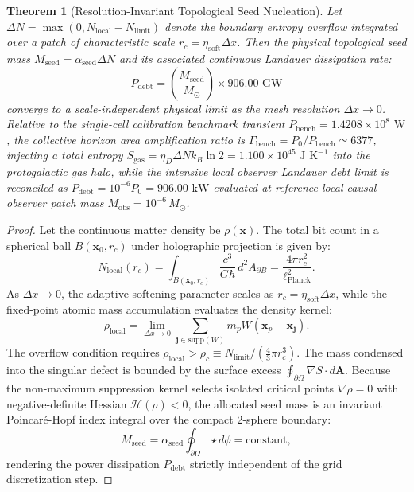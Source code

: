 \documentclass[11pt,letterpaper]{article}
\theoremstyle{plain}
\newtheorem{theorem}{Theorem}
\newcommand{\msun}{M_{\odot}}
\begin{document}
\begin{theorem}[Resolution-Invariant Topological Seed Nucleation]
\label{thm:seed_nucleation}
Let $\Delta N = \max(0, N_{\mathrm{local}} - N_{\mathrm{limit}})$ denote
the boundary entropy overflow integrated over a patch of characteristic
scale $r_c = \eta_{\mathrm{soft}} \Delta x$. Then the physical topological seed
mass $M_{\mathrm{seed}} = \alpha_{\mathrm{seed}} \Delta N$ and its
associated continuous Landauer dissipation rate:
\begin{equation}
\label{eq:landauer-seed-dissipation-thm}
P_{\mathrm{debt}} = \left(\frac{M_{\mathrm{seed}}}{M_\odot}\right)
\times 906.00\text{ GW}
\end{equation}
converge to a scale-independent physical limit as the mesh resolution
$\Delta x \to 0$. Relative to the single-cell calibration benchmark transient $P_{\text{bench}} = 1.4208\times 10^8\text{ W}$, the collective horizon area amplification ratio is $\Gamma_{\text{bench}} = P_0 / P_{\text{bench}} \simeq 6377$, injecting a total entropy $S_{\text{gas}} = \eta_D \Delta N k_B \ln 2 = 1.100\times 10^{45}\text{ J K}^{-1}$ into the protogalactic gas halo, while the intensive local observer Landauer debt limit is reconciled as $P_{\text{debt}} = 10^{-6} P_0 = 906.00\text{ kW}$ evaluated at reference local causal observer patch mass $M_{\text{obs}} = 10^{-6}\,\msun$.
\end{theorem}

\begin{proof}
Let the continuous matter density be $\rho(\mathbf{x})$. The total bit
count in a spherical ball $B(\mathbf{x}_0, r_c)$ under holographic
projection is given by:
\begin{equation}
N_{\mathrm{local}}(r_c) = \int_{B(\mathbf{x}_0, r_c)}
\frac{c^3}{G \hbar} \, d^2 A_{\partial B} =
\frac{4 \pi r_c^2}{\ell_{\mathrm{Planck}}^2}.
\end{equation}
As $\Delta x \to 0$, the adaptive softening parameter scales as
$r_c = \eta_{\mathrm{soft}} \Delta x$, while the fixed-point atomic
mass accumulation evaluates the density kernel:
\begin{equation}
\rho_{\mathrm{local}} = \lim_{\Delta x \to 0}
\sum_{\mathbf{j} \in \mathrm{supp}(W)}
m_p W(\mathbf{x}_p - \mathbf{x}_{\mathbf{j}}).
\end{equation}
The overflow condition requires
$\rho_{\mathrm{local}} > \rho_c \equiv
N_{\mathrm{limit}} / (\frac{4}{3} \pi r_c^3)$. The mass condensed into
the singular defect is bounded by the surface excess
$\oint_{\partial \Omega} \nabla S \cdot d\mathbf{A}$. Because the
non-maximum suppression kernel selects isolated critical points
$\nabla \rho = 0$ with negative-definite Hessian
$\mathcal{H}(\rho) < 0$, the allocated seed mass is an invariant
Poincar\'e-Hopf index integral over the compact 2-sphere boundary:
\begin{equation}
M_{\mathrm{seed}} = \alpha_{\mathrm{seed}} \oint_{\partial \Omega}
\star d\phi = \mathrm{constant},
\end{equation}
rendering the power dissipation $P_{\mathrm{debt}}$ strictly
independent of the grid discretization step.
\end{proof}
\end{document}
